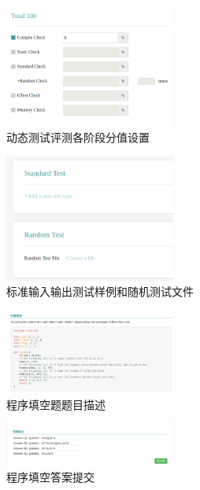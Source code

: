 	\begin{figure}[h]
		\centering
		\includegraphics[width=0.5\textwidth]{image/appendix/6}
		\caption{动态测试评测各阶段分值设置}
	\end{figure}
	\begin{figure}[h]
		\centering
		\includegraphics[width=0.5\textwidth]{image/appendix/7}
		\caption{标准输入输出测试样例和随机测试文件}
	\end{figure}
	\begin{figure}[h]
		\centering
		\includegraphics[width=0.5\textwidth]{image/appendix/8}
		\caption{程序填空题题目描述}
	\end{figure}
	\begin{figure}[h]
		\centering
		\includegraphics[width=0.5\textwidth]{image/appendix/9}
		\caption{程序填空答案提交}
	\end{figure}
\endinput

